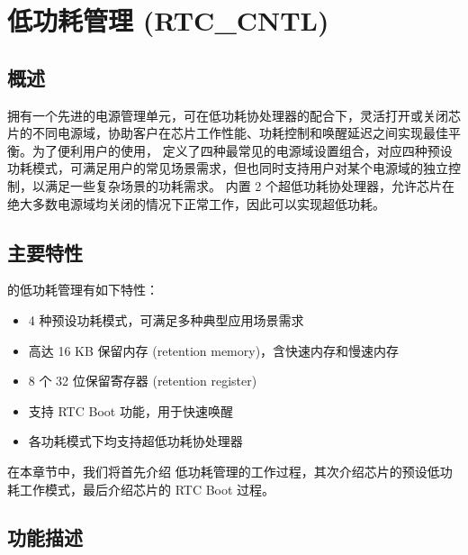 \documentclass[main\_\_CN.tex]{subfiles}
\begin{document}

\ifglobal
\else
    {\let\clearpage\relax \listoftodos}
    \tableofcontents
\fi



\hypertarget{lowpowm}{}
\chapter{低功耗管理 (RTC\_CNTL)}\label{mod:lowpowm}

\section{概述}

\chipname{} 拥有一个先进的电源管理单元，可在低功耗协处理器的配合下，灵活打开或关闭芯片的不同电源域，协助客户在芯片工作性能、功耗控制和唤醒延迟之间实现最佳平衡。为了便利用户的使用，\chipname{} 定义了四种最常见的电源域设置组合，对应四种预设功耗模式，可满足用户的常见场景需求，但也同时支持用户对某个电源域的独立控制，以满足一些复杂场景的功耗需求。\chipname{} 内置 2 个超低功耗协处理器，允许芯片在绝大多数电源域均关闭的情况下正常工作，因此可以实现超低功耗。

\section{主要特性}
\chipname{} 的低功耗管理有如下特性：
\begin{itemize}
\item 4 种预设功耗模式，可满足多种典型应用场景需求
\item 高达 16 KB 保留内存 (retention memory)，含快速内存和慢速内存
\item 8 个 32 位保留寄存器 (retention register)
\item 支持 RTC Boot 功能，用于快速唤醒
\item 各功耗模式下均支持超低功耗协处理器
\end{itemize}

在本章节中，我们将首先介绍 \chipname{} 低功耗管理的工作过程，其次介绍芯片的预设低功耗工作模式，最后介绍芯片的 RTC Boot 过程。

\section{功能描述}
\end{document}

